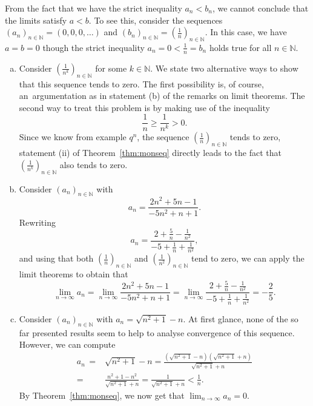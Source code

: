\begin{Attention}{}
  From the fact that we have the strict inequality $a_n<b_n$, we cannot conclude that the limits satisfy $a<b$. To see this, consider the sequences\linebreak $(a_n)_{n\in\mathbb{N}}=(0,0,0,\ldots)$ and
  $(b_n)_{n\in\mathbb{N}}=(\frac1n)_{n\in\mathbb{N}}$. In this case, we have $a=b=0$ though the strict inequality $a_n=0<\frac1n=b_n$ holds true for all $n\in\mathbb{N}$.
\end{Attention}

\begin{example}
\begin{enumerate}[a)]
  \item Consider $(\frac1{n^k})_{n\in\mathbb{N}}$ for some $k\in\mathbb{N}$. We state two alternative ways to show that this sequence tends to zero.
The first possibility is, of course, an~argumentation as in statement (b) of the remarks on limit theorems. The second way to treat this problem is by making use of the inequality
\[\frac1n\geq\frac1{n^k}>0.\]
    Since we know from example $q^n$, the sequence $(\frac1n)_{n\in\mathbb{N}}$ tends to zero, statement (ii) of Theorem~\ref{thm:monseq} directly leads to the fact that
    $(\frac1{n^k})_{n\in\mathbb{N}}$ also tends to zero.
  \item Consider $(a_n)_{n\in\mathbb{N}}$ with
\[a_n=\frac{2n^2+5n-1}{-5n^2+n+1}.\]
Rewriting
\[a_n=\frac{2+\frac5n-\frac1{n^2}}{-5+\frac1n+\frac1{n^2}},\]
    and using that both $(\frac1{n})_{n\in\mathbb{N}}$ and $(\frac1{n^2})_{n\in\mathbb{N}}$ tend to zero, we can apply the limit theorems to obtain that
\[\lim_{n\to\infty}a_n=\lim_{n\to\infty}\frac{2n^2+5n-1}{-5n^2+n+1}=\lim_{n\to\infty}\frac{2+\frac5n-\frac1{n^2}}{-5+\frac1n+\frac1{n^2}}=-\frac25.\]
\item Consider $(a_n)_{n\in\mathbb{N}}$ with $a_n=\sqrt{n^2+1}-n$. At first glance, none of the so far presented results seem to help to analyse convergence of this sequence. However, we can compute
\[
\begin{aligned}
a_n\,=&\sqrt{n^2+1}-n
=\frac{(\sqrt{n^2+1}-n)(\sqrt{n^2+1}+n)}{\sqrt{n^2+1}+n}\\
=&\frac{n^2+1-n^2}{\sqrt{n^2+1}+n}
=\frac{1}{\sqrt{n^2+1}+n}<\frac1n.
\end{aligned}
\]
By Theorem~\ref{thm:monseq}, we now get that $\lim_{n\to\infty}a_n=0$.
\end{enumerate}
\end{example}
